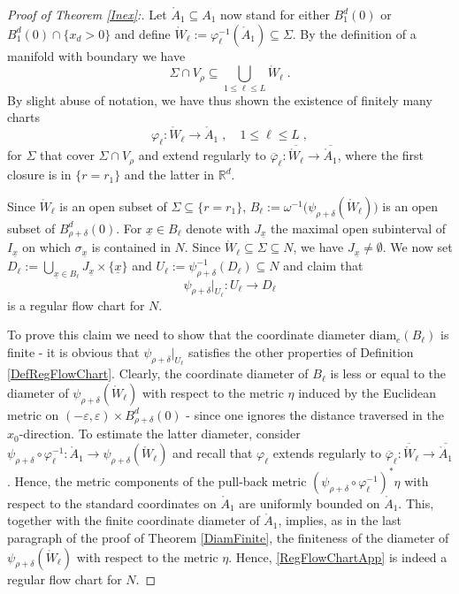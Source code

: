 \documentclass[reqno]{article}
\newcommand{\R}{\mathbb{R}}
\newcommand{\diam}{\mathrm{diam}}
\newcommand{\ux}{\underline{x}}
\begin{document}
\begin{proof}[Proof of Theorem \ref{Inex}:]
Let $\mathring{A}_1 \subseteq A_1$ now stand for either $B^d_1(0)$ or $B^d_1(0) \cap \{x_d >0\}$ and define $\mathring{W}_\ell := \varphi_\ell^{-1}(\mathring{A}_1) \subseteq \Sigma$. By the definition of a manifold with boundary we have 
\begin{equation}
\label{Cover}\Sigma \cap V_\rho \subseteq \bigcup_{1 \leq \ell \leq L} \mathring{W}_\ell\;.
\end{equation} 
By slight abuse of notation, we have thus shown the existence of finitely many charts
\begin{equation*}
\varphi_\ell : \mathring{W}_\ell \to \mathring{A}_1\;, \quad  1 \leq \ell \leq L \;,
\end{equation*}
for $\Sigma$ that cover $\Sigma \cap V_\rho$ and extend regularly to $\overline{\varphi}_\ell : \overline{\mathring{W}_\ell} \to \overline{\mathring{A}_1}$, where the first closure is in $\{r = r_1\}$ and the latter in $\R^d$.

Since $\mathring{W}_\ell$ is an open subset of $\Sigma \subseteq \{r = r_1\}$, $B_\ell := \omega^{-1} \big( \psi_{\rho + \delta}(\mathring{W}_\ell)\big)$ is an open subset of $B^d_{\rho + \delta}(0)$. For $\ux \in B_\ell$ denote with $J_{\ux}$ the maximal open subinterval of $I_{\ux}$ on which $\sigma_{\ux}$ is contained in $N$. Since $\mathring{W}_\ell \subseteq \Sigma \subseteq N$, we have $J_{\ux} \neq \emptyset$. We now set $D_\ell := \bigcup_{\ux \in B_\ell} J_{\ux} \times \{\ux\}$ and $U_\ell := \psi_{\rho + \delta}^{-1}(D_\ell) \subseteq N$ and claim that
\begin{equation}
\label{RegFlowChartApp}
\psi_{\rho + \delta}\big|_{U_\ell} : U_\ell \to D_\ell
\end{equation} 
is a regular flow chart for $N$.

To prove this claim we need to show that the coordinate diameter $\diam_e(B_\ell)$ is finite - it is obvious that $\psi_{\rho + \delta}\big|_{U_\ell}$ satisfies the other properties of Definition \ref{DefRegFlowChart}. Clearly, the coordinate diameter of $B_\ell$ is less or equal to the diameter of $\psi_{\rho + \delta}(\mathring{W}_\ell)$ with respect to the metric $\eta$ induced by the Euclidean metric on $(-\varepsilon, \varepsilon) \times B_{\rho + \delta}^d(0)$ - since one ignores the distance traversed in the $x_0$-direction. To estimate the latter diameter, consider $\psi_{\rho + \delta} \circ \varphi_\ell^{-1} : \mathring{A}_1 \to \psi_{\rho + \delta}(\mathring{W}_\ell)$ and recall that $\varphi_\ell$ extends regularly to $\overline{\varphi}_\ell : \overline{\mathring{W}}_\ell \to \overline{\mathring{A}_1}$. Hence, the metric components of the pull-back metric $(\psi_{\rho + \delta} \circ \varphi_\ell^{-1})^*\eta$ with respect to the standard coordinates on $\mathring{A}_1$ are uniformly bounded on $\mathring{A}_1$. This, together with the finite coordinate diameter of $\mathring{A}_1$, implies, as in the last paragraph of the proof of Theorem \ref{DiamFinite}, the finiteness of the diameter of $\psi_{\rho + \delta}(\mathring{W}_\ell)$ with respect to the metric $\eta$. Hence, \eqref{RegFlowChartApp} is indeed a regular flow chart for $N$.
\vspace*{2mm}


\end{proof}
\end{document}

